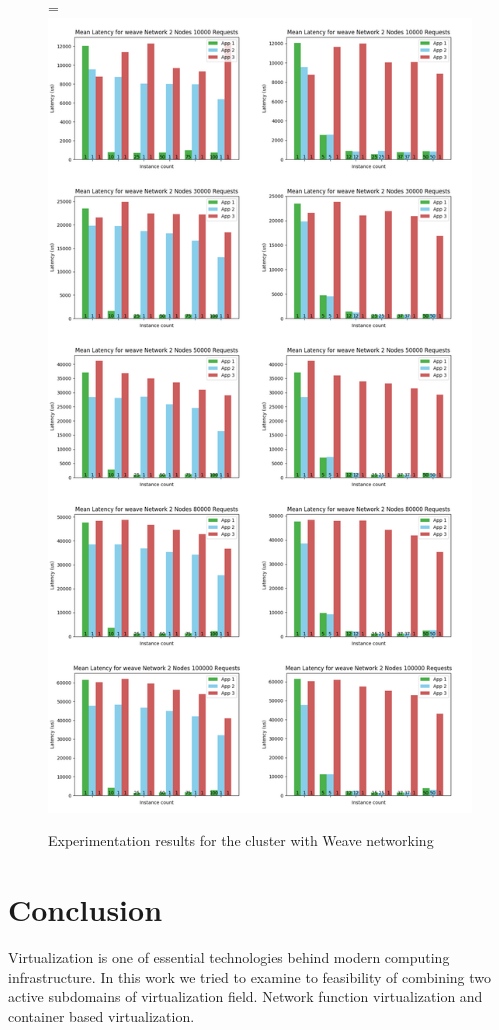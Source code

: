 \documentclass[12pt,oneandhalf,chaparabic,ceng,ms,eng,oneside,pntc]{gsufbe}
\makeatletter
\let\old@includegraphics\includegraphics
\renewcommand{\includegraphics}[2][,]{%
  \setbox9=\hbox{\old@includegraphics[#1]{#2}}%
  \ifdim\wd9>\textwidth
    \old@includegraphics[#1,width=\textwidth]{#2}%
  \else
    \old@includegraphics[#1]{#2}%
  \fi%
}
\makeatother
\begin{document}
\begin{figure}
\centering
\includegraphics[]{weave.png}
\caption{Experimentation results for the cluster with Weave networking}
\label{weave}
\end{figure}

\chapter{Conclusion}
Virtualization is one of essential technologies behind modern computing infrastructure. In this work we
tried to examine to feasibility of combining two active subdomains of virtualization field. Network
function virtualization and container based virtualization.
\end{document}
